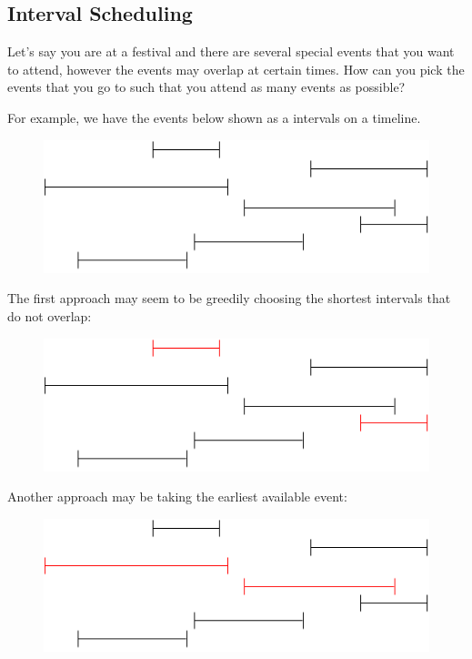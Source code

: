 \documentclass[11pt,oneside]{book}
\makeatletter
\def\maxwidth#1{\ifdim\Gin@nat@width>#1 #1\else\Gin@nat@width\fi}
\makeatother
\begin{document}
\subsection{Interval Scheduling}

Let's say you are at a festival and there are several special events that you want to attend, however the events may overlap at certain times. How can you pick the events that you go to such that you attend as many events as possible?

For example, we have the events below shown as a intervals on a timeline.

\vspace{5px}\begin{figure}[H]\centering
        \includegraphics[width=0.66\maxwidth{\textwidth}]{intervalschedule.png}
        \end{figure}

The first approach may seem to be greedily choosing the shortest intervals that do not overlap:

\vspace{5px}\begin{figure}[H]\centering
        \includegraphics[width=0.66\maxwidth{\textwidth}]{intervalschedule2.png}
        \end{figure}

Another approach may be taking the earliest available event:

\vspace{5px}\begin{figure}[H]\centering
        \includegraphics[width=0.66\maxwidth{\textwidth}]{intervalschedule3.png}
        \end{figure}
\end{document}
